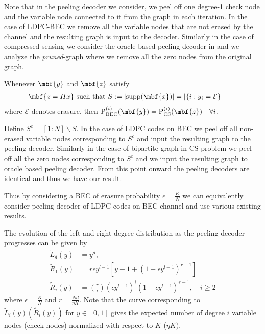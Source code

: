 \documentclass[conference]{IEEEtran}
\begin{document}
Note that in the peeling decoder we consider, we peel off one degree-1 check node and the variable node connected to it from the graph in each iteration. In the case of LDPC-BEC we remove all the variable nodes that are not erased by the channel and the resulting graph is input to the decoder. Similarly in the case of compressed sensing we consider the  oracle based peeling decoder in \cite{li2015subdraft} and we analyze the \textit{pruned}-graph where we remove all the zero nodes from the original graph.

\begin{lemma}
\label{Lemma:Equiv_LDPC_BEC}
Whenever $\mbf{y}$ and $\mbf{z}$ satisfy
\begin{align*}
\mbf{z=Hx} \text{ such that  } S:=|\text{supp}(\mbf{x})|=|\{i:y_i=\mathcal{E}\}|  \qquad
\end{align*}
where $\mathcal{E}$ denotes erasure, then $\text{P}_{\text{BEC}}^{(i)}(\mbf{y})=\text{P}_{\text{CS}}^{(i)}(\mbf{z}) \quad \forall i$.
\end{lemma}
\begin{IEEEproof}
Define $S^c=[1:N]\backslash S$. In the case of LDPC codes on BEC we peel off all non-erased variable nodes corresponding to $S^c$  and input the resulting graph to the peeling decoder. Similarly in the case of bipartite graph in CS problem we peel off all the zero nodes corresponding to $S^c$ and we input the resulting graph to oracle based peeling decoder. From this point onward the peeling decoders are identical and thus we have our result.
\end{IEEEproof}
\vspace{1ex}
Thus by considering a BEC of erasure probability $\epsilon=\frac{K}{N}$ we can equivalently consider peeling decoder of LDPC codes on BEC channel and use various existing results.
\begin{lemma}
\label{lem:RightDegEvolution}
The evolution of the left and right degree distribution as the peeling decoder progresses can be given by
\begin{align*}
\tilde{L}_d(y)&= y^d,\\
\tilde{R}_{1}(y)&=r\epsilon y^{l-1}[y-1+ (1-\epsilon y^{l-1})^{r-1}]\\
\tilde{R}_{i}(y)&=\binom{r}{i}(\epsilon y^{l-1})^i (1-\epsilon y^{l-1})^{r-1}, \quad i\geq 2
\end{align*}
where $\epsilon=\frac{K}{N}$ and $r=\frac{Nd}{\eta K}$. Note that the curve corresponding to $\tilde{L}_i(y)(\tilde{R}_{i}(y))$ for $y\in[0,1]$ gives the expected number of degree $i$ variable nodes (check nodes) normalized with respect to $K$ ($\eta K)$.
\end{lemma}
\end{document}
